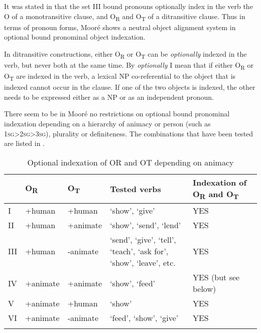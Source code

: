 \documentclass[output=paper]{langsci/langscibook}
\begin{document}
\z

It was stated in  that the set III bound pronouns optionally index in the verb the O of a monotransitive clause, and O\textsubscript{R} and O\textsubscript{T} of a ditransitive clause. Thus in terms of pronoun forms, Mooré shows a neutral object alignment system in optional bound pronominal object indexation.  

In ditransitive constructions, either O\textsubscript{R} or O\textsubscript{T} can be \textit{optionally} indexed in the verb, but never both at the same time. By \textit{optionally} I mean that if either O\textsubscript{R} or O\textsubscript{T} are indexed in the verb, a lexical NP co-referential to the object that is indexed cannot occur in the clause. If one of the two objects is indexed, the other needs to be expressed either as a NP or as an independent pronoun. 

There seem to be in Mooré no restrictions on optional bound pronominal indexation depending on a hierarchy of animacy or person (such as 1\textsc{sg}>2\textsc{sg}>3\textsc{sg}), plurality or definiteness. The combinations that have been tested are listed in .

\begin{table}
\begin{tabularx}{\textwidth}{lll>{\raggedright\arraybackslash}Xl} 
\lsptoprule & {O}{\textsubscript{R}} & {O}{\textsubscript{T}} & {Tested verbs} & {Indexation of O}{\textsubscript{R}}{ and O}{\textsubscript{T}}{} \\
\midrule
I & +human & +human & `show', `give' & YES\\
II & +human & +animate & `show', `send', `lend' & YES\\
III & +human & -animate & `send', `give', `tell', `teach', `ask for', `show', `leave', etc. & YES\\
IV & +animate & +animate & `show', `feed' & YES (but see below)\\
V & +animate & +human & `show' & YES\\
VI & +animate & -animate & `feed', `show', `give' & YES\\
\lspbottomrule
\end{tabularx}
\caption{Optional indexation of OR and OT depending on animacy}
\label{tab:3.pacchiarotti}

 \end{table}
\end{document}
